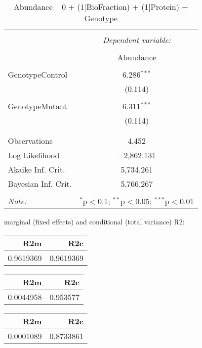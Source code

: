 \documentclass[11pt]{report}
\begin{document}
\begin{table}[!htbp] \centering 
  \caption{Abundance ~ 0 + (1|BioFraction) + (1|Protein) + Genotype} 
  \label{} 
\begin{tabular}{@{\extracolsep{5pt}}lc} 
\\[-1.8ex]\hline 
\hline \\[-1.8ex] 
 & \multicolumn{1}{c}{\textit{Dependent variable:}} \\ 
\cline{2-2} 
\\[-1.8ex] & Abundance \\ 
\hline \\[-1.8ex] 
 GenotypeControl & 6.286$^{***}$ \\ 
  & (0.114) \\ 
  & \\ 
 GenotypeMutant & 6.311$^{***}$ \\ 
  & (0.114) \\ 
  & \\ 
\hline \\[-1.8ex] 
Observations & 4,452 \\ 
Log Likelihood & $-$2,862.131 \\ 
Akaike Inf. Crit. & 5,734.261 \\ 
Bayesian Inf. Crit. & 5,766.267 \\ 
\hline 
\hline \\[-1.8ex] 
\textit{Note:}  & \multicolumn{1}{r}{$^{*}$p$<$0.1; $^{**}$p$<$0.05; $^{***}$p$<$0.01} \\ 
\end{tabular} 
\end{table} 
marginal (fixed effects) and conditional (total variance) R2:

\begin{tabular}{r|r}
\hline
R2m & R2c\\
\hline
0.9619369 & 0.9619369\\
\hline
\end{tabular}

\begin{tabular}{r|r}
\hline
R2m & R2c\\
\hline
0.0044958 & 0.953577\\
\hline
\end{tabular}

\begin{tabular}{r|r}
\hline
R2m & R2c\\
\hline
0.0001089 & 0.8733861\\
\hline
\end{tabular}
\end{document}
